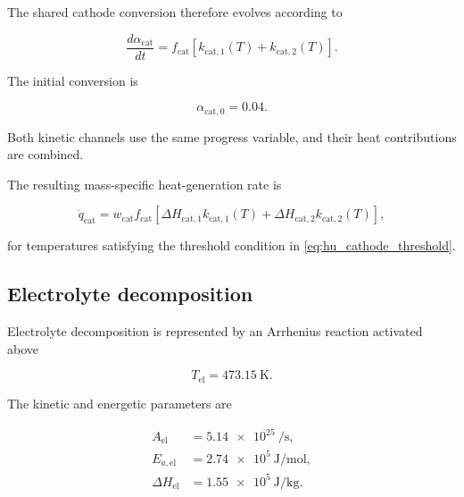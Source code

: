 The shared cathode conversion therefore evolves according to

\begin{equation}
    \frac{d\alpha_{\mathrm{cat}}}{dt}
    =
    f_{\mathrm{cat}}
    \left[
        k_{\mathrm{cat},1}(T)
        +
        k_{\mathrm{cat},2}(T)
    \right].
    \label{eq:hu_cathode_conversion}
\end{equation}

The initial conversion is

\begin{equation}
    \alpha_{\mathrm{cat},0}
    =
    0.04.
\end{equation}

Both kinetic channels use the same progress variable, and their heat
contributions are combined.

The resulting mass-specific heat-generation rate is

\begin{equation}
    \dot{q}_{\mathrm{cat}}
    =
    w_{\mathrm{cat}}
    f_{\mathrm{cat}}
    \left[
        \Delta H_{\mathrm{cat},1}
        k_{\mathrm{cat},1}(T)
        +
        \Delta H_{\mathrm{cat},2}
        k_{\mathrm{cat},2}(T)
    \right],
    \label{eq:hu_cathode_heat}
\end{equation}

for temperatures satisfying the threshold condition in
\cref{eq:hu_cathode_threshold}.


\subsection{Electrolyte decomposition}

Electrolyte decomposition is represented by an Arrhenius reaction
activated above

\begin{equation}
    T_{\mathrm{el}}
    =
    \SI{473.15}{\kelvin}.
    \label{eq:hu_electrolyte_threshold}
\end{equation}

The kinetic and energetic parameters are

\begin{align}
    A_{\mathrm{el}}
    &=
    \num{5.14e25}
    \ \si{\per\second},
    \\
    E_{a,\mathrm{el}}
    &=
    \num{2.74e5}
    \ \si{\joule\per\mole},
    \\
    \Delta H_{\mathrm{el}}
    &=
    \num{1.55e5}
    \ \si{\joule\per\kilogram}.
\end{align}

